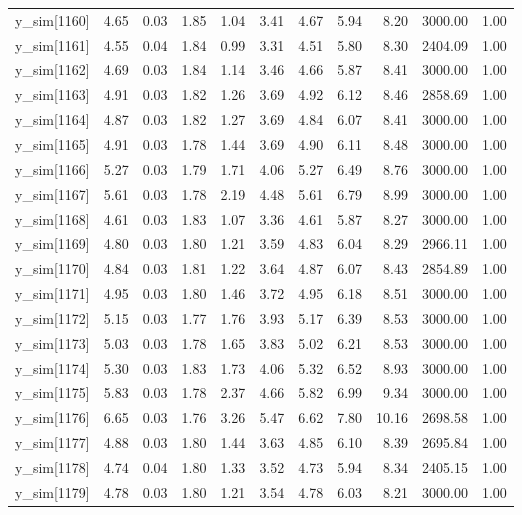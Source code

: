 \begin{table}[ht]
\begin{tabular}{rrrrrrrrrrr}
  y\_sim[1160] & 4.65 & 0.03 & 1.85 & 1.04 & 3.41 & 4.67 & 5.94 & 8.20 & 3000.00 & 1.00 \\ 
  y\_sim[1161] & 4.55 & 0.04 & 1.84 & 0.99 & 3.31 & 4.51 & 5.80 & 8.30 & 2404.09 & 1.00 \\ 
  y\_sim[1162] & 4.69 & 0.03 & 1.84 & 1.14 & 3.46 & 4.66 & 5.87 & 8.41 & 3000.00 & 1.00 \\ 
  y\_sim[1163] & 4.91 & 0.03 & 1.82 & 1.26 & 3.69 & 4.92 & 6.12 & 8.46 & 2858.69 & 1.00 \\ 
  y\_sim[1164] & 4.87 & 0.03 & 1.82 & 1.27 & 3.69 & 4.84 & 6.07 & 8.41 & 3000.00 & 1.00 \\ 
  y\_sim[1165] & 4.91 & 0.03 & 1.78 & 1.44 & 3.69 & 4.90 & 6.11 & 8.48 & 3000.00 & 1.00 \\ 
  y\_sim[1166] & 5.27 & 0.03 & 1.79 & 1.71 & 4.06 & 5.27 & 6.49 & 8.76 & 3000.00 & 1.00 \\ 
  y\_sim[1167] & 5.61 & 0.03 & 1.78 & 2.19 & 4.48 & 5.61 & 6.79 & 8.99 & 3000.00 & 1.00 \\ 
  y\_sim[1168] & 4.61 & 0.03 & 1.83 & 1.07 & 3.36 & 4.61 & 5.87 & 8.27 & 3000.00 & 1.00 \\ 
  y\_sim[1169] & 4.80 & 0.03 & 1.80 & 1.21 & 3.59 & 4.83 & 6.04 & 8.29 & 2966.11 & 1.00 \\ 
  y\_sim[1170] & 4.84 & 0.03 & 1.81 & 1.22 & 3.64 & 4.87 & 6.07 & 8.43 & 2854.89 & 1.00 \\ 
  y\_sim[1171] & 4.95 & 0.03 & 1.80 & 1.46 & 3.72 & 4.95 & 6.18 & 8.51 & 3000.00 & 1.00 \\ 
  y\_sim[1172] & 5.15 & 0.03 & 1.77 & 1.76 & 3.93 & 5.17 & 6.39 & 8.53 & 3000.00 & 1.00 \\ 
  y\_sim[1173] & 5.03 & 0.03 & 1.78 & 1.65 & 3.83 & 5.02 & 6.21 & 8.53 & 3000.00 & 1.00 \\ 
  y\_sim[1174] & 5.30 & 0.03 & 1.83 & 1.73 & 4.06 & 5.32 & 6.52 & 8.93 & 3000.00 & 1.00 \\ 
  y\_sim[1175] & 5.83 & 0.03 & 1.78 & 2.37 & 4.66 & 5.82 & 6.99 & 9.34 & 3000.00 & 1.00 \\ 
  y\_sim[1176] & 6.65 & 0.03 & 1.76 & 3.26 & 5.47 & 6.62 & 7.80 & 10.16 & 2698.58 & 1.00 \\ 
  y\_sim[1177] & 4.88 & 0.03 & 1.80 & 1.44 & 3.63 & 4.85 & 6.10 & 8.39 & 2695.84 & 1.00 \\ 
  y\_sim[1178] & 4.74 & 0.04 & 1.80 & 1.33 & 3.52 & 4.73 & 5.94 & 8.34 & 2405.15 & 1.00 \\ 
  y\_sim[1179] & 4.78 & 0.03 & 1.80 & 1.21 & 3.54 & 4.78 & 6.03 & 8.21 & 3000.00 & 1.00 \\ 

\end{tabular}
\end{table}
